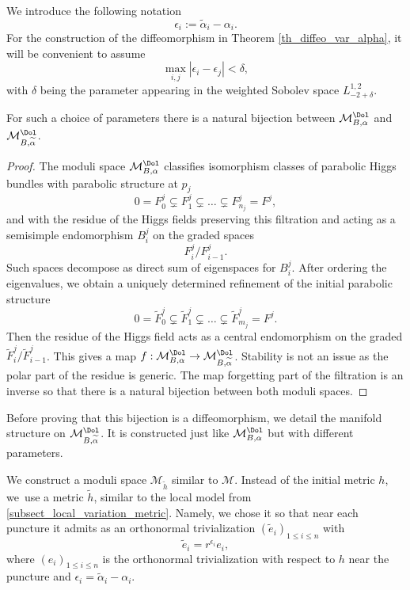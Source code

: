 We introduce the following notation
\[
\epsilon_i := \widetilde{\alpha}_i-\alpha_i.
\]
For the construction of the diffeomorphism in Theorem \ref{th_diffeo_var_alpha}, it will be convenient to assume
\[
\max_{i,j}|\epsilon_i-\epsilon_j| < \delta,
\]
with $\delta$ being the parameter appearing in the weighted Sobolev space $L^{1,2}_{-2+\delta}$.
\begin{proposition}\label{prop_bijection_dol}
For such a choice of parameters there is a natural bijection between $\mathcal{M}^{\Dol}_{B,\alpha}$ and $\mathcal{M}^{\Dol}_{B,\widetilde{\alpha}}$.
\end{proposition}
\begin{proof}
The moduli space $\mathcal{M}^{\Dol}_{B,\alpha}$ classifies isomorphism classes of parabolic Higgs bundles with parabolic structure at $p_j$
\[
0= F^j_0 \subsetneq F^j_1 \subsetneq \dots \subsetneq F^j_{n_j}=F^j,
\]
and with the residue of the Higgs fields preserving this filtration and acting as a semisimple endomorphism $B^j_i$ on the graded spaces
\[
F^j_i / F^j_{i-1}.
\]
Such spaces decompose as direct sum of eigenspaces for $B^j_i$. After ordering the eigenvalues, we obtain a uniquely determined refinement of the initial parabolic structure
\[
0 = \widetilde{F}^j_0 \subsetneq \widetilde{F}^j_1 \subsetneq \dots \subsetneq \widetilde{F}^j_{m_j} = F^j.
\]
Then the residue of the Higgs field acts as a central endomorphism on the graded $\widetilde{F}^j_i / \widetilde{F}^j_{i-1}$.
This gives a map $f:\mathcal{M}^{\Dol}_{B,\alpha}\to \mathcal{M}^{\Dol}_{B,\widetilde{\alpha}}$. Stability is not an issue as the polar part of the residue is generic. The map forgetting part of the filtration is an inverse so that there is a natural bijection between both moduli spaces.
\end{proof}

Before proving that this bijection is a diffeomorphism, we detail the manifold structure on $\mathcal{M}_{B,\widetilde{\alpha}}^{\Dol}$. It is constructed just like $\mathcal{M}^{\Dol}_{B,\alpha}$ but with different parameters.

We construct a moduli space $\mathcal{M}_{\widetilde{h}}$ similar to $\mathcal{M}$. Instead of the initial metric $h$, we~use a metric $\widetilde{h}$, similar to the local model from \ref{subsect_local_variation_metric}. Namely, we chose it so that near each puncture it admits as an orthonormal trivialization $(\widetilde{e}_i)_{1\le i \le n}$ with
\[
\widetilde{e}_i = r^{\epsilon_i} e_i,
\]
where $(e_i)_{1\le i \le n}$ is the orthonormal trivialization with respect to $h$ near the puncture and $\epsilon_i=\widetilde{\alpha}_i-\alpha_i$.

